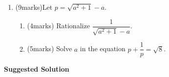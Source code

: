 \documentclass[12pt]{article}
\begin{document}
\begin{enumerate}
        \hrulefill

        \hrulefill

        \hrulefill

        \hrulefill

        \hrulefill

        \hrulefill

        \hrulefill

        \hrulefill

        \hrulefill
        \item (9marks)Let $p=\sqrt{a^2+1}-a$.\begin{enumerate}
            \item (4marks) Rationalize $\dfrac{1}{\sqrt{a^2+1}-a}$.
            \item (5marks) Solve $a$ in the equation $p+\dfrac{1}{p}=\sqrt{8}$.
        \end{enumerate}

        \hrulefill

        \hrulefill

        \hrulefill

        \hrulefill

        \hrulefill

        \hrulefill

        \hrulefill

        \hrulefill

        \hrulefill

        \hrulefill

        \hrulefill

        \hrulefill

        \hrulefill

        \hrulefill

        \hrulefill

        \hrulefill

        \hrulefill

        \hrulefill

        \hrulefill

        \hrulefill

        \hrulefill

        \hrulefill

        \hrulefill

        \hrulefill
    \end{enumerate}

    \newpage

    \begin{center}
        \textbf{Suggested Solution}
    \end{center}
\end{document}
